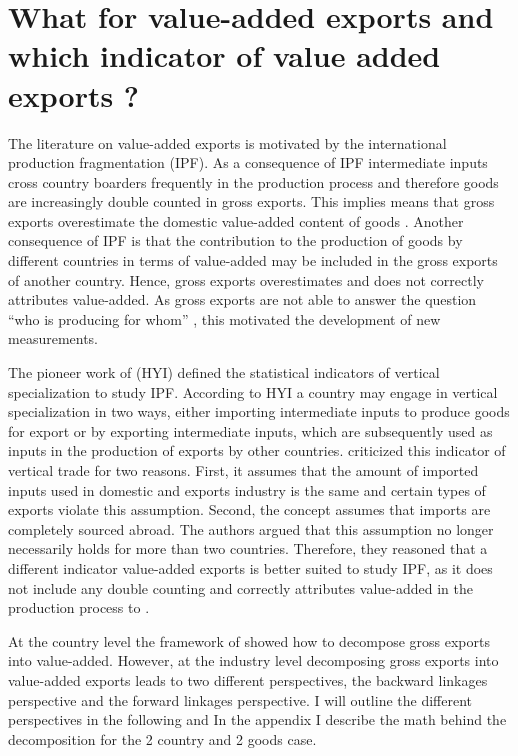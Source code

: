 \section{What for value-added exports and which indicator of value added exports ?} \label{sec:vax} 
The literature on value-added exports is motivated by the international production fragmentation (IPF). As a consequence of IPF  intermediate inputs cross country boarders frequently in the production process and therefore goods are increasingly double counted in gross exports. This implies means that gross exports overestimate the domestic value-added content of goods \parencite{johnson}. Another consequence of IPF is that the contribution to the production of goods by different countries in terms of value-added may be included in the gross exports of another country. Hence, gross exports overestimates and does not correctly attributes value-added. As gross exports are not able to answer the question ``who is producing for whom'' \textcite{daudin}, this motivated the development of new measurements. \par    
The pioneer work of \textcite{Hummels} (HYI) defined the statistical indicators of vertical specialization to study IPF.  According to HYI a country may engage in vertical specialization in two ways, either importing intermediate inputs to produce goods for export or by exporting intermediate inputs, which are subsequently used as inputs in the production of exports by other countries.  \textcite{Koopman} criticized this indicator of vertical trade for two reasons. First, it assumes that the amount of imported inputs used in domestic and exports industry is the same and certain types of exports violate this assumption. Second, the concept assumes that imports are completely sourced abroad. The authors argued that this assumption no longer necessarily holds for more than two countries. Therefore, they reasoned that a different indicator value-added exports is better suited to study IPF, as it does not include any double counting and correctly attributes value-added in the production process to . %
\par
At the country level the framework of \textcite{Koopman} showed how to decompose gross exports into value-added. However, at the industry level decomposing gross exports into value-added exports leads to two different perspectives, the backward linkages perspective and the forward linkages perspective\textcite{wang2013}.  I will outline the different perspectives in the following and In the appendix I describe the math behind the decomposition for the 2 country and 2 goods case. \par 
